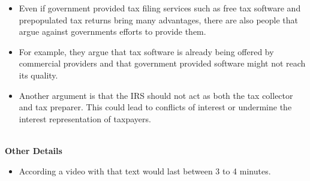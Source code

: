 \documentclass[12pt]{article}
\begin{document}
\begin{itemize}
    \item Even if government provided tax filing services such as free tax software and prepopulated tax returns bring many advantages, there are also people that argue against governments efforts to provide them.
    \item For example, they argue that tax software is already being offered by commercial providers and that government provided software might not reach its quality. 
    \item Another argument is that the IRS should not act as both the tax collector and tax preparer. This could lead to conflicts of interest or undermine the interest representation of taxpayers.
\end{itemize}
\\
\textbf{Other Details}
\begin{itemize}
    \item According a video with that text would last between 3 to 4 minutes. 
\end{itemize}
\end{document}
